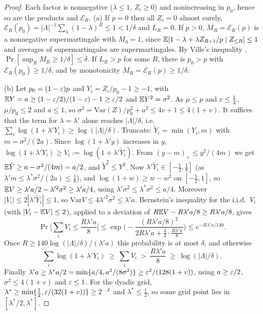 \begin{proof}
Each factor is nonnegative ($\lambda\le1$, $Z_i\ge0$) and nonincreasing in $p_0$, hence so
are the products and $\mathcal E_R$. (a) If $p=0$ then all $Z_i=0$ almost surely,
$\mathcal E_R(p_0)=|\Lambda|^{-1}\sum_\lambda(1-\lambda)^R\le1<1/\delta$ and $L_R=0$. If $p>0$,
$M_R=\mathcal E_R(p)$ is a nonnegative supermartingale with $M_0=1$, since
$\mathbb{E}[1-\lambda+\lambda Z_{R+1}/p\mid Z_{\le R}]\le1$ and averages of supermartingales are
supermartingales. By Ville's inequality \cite{ville1939},
$\Pr[\sup_RM_R\ge1/\delta]\le\delta$. If $L_R>p$ for some $R$, there is $p_0>p$ with
$\mathcal E_R(p_0)\ge1/\delta$, and by monotonicity $M_R=\mathcal E_R(p)\ge1/\delta$.

(b) Let $p_0=(1-\varepsilon)p$ and $Y_i=Z_i/p_0-1\ge-1$, with $\mathbb{E} Y=a\ge(1-\varepsilon/2)/(1-\varepsilon)-1\ge
\varepsilon/2$ and $\mathbb{E} Y^2=\sigma^2$. As $\mu\le p$ and $\varepsilon\le\frac12$, $\mu/p_0\le2$ and
$a\le1$, so $\sigma^2=\mathrm{Var}(Z)/p_0^2+a^2\le4v+1\le4(1+v)$. It suffices that the
term for $\lambda=\lambda'$ alone reaches $|\Lambda|/\delta$, i.e.\
$\sum_i\log(1+\lambda'Y_i)\ge\log(|\Lambda|/\delta)$. Truncate: $\tilde Y_i=\min(Y_i,m)$ with
$m=\sigma^2/(2a)$. Since $\log(1+\lambda'y)$ increases in $y$, $\log(1+\lambda'Y_i)\ge
V_i:=\log(1+\lambda'\tilde Y_i)$. From $(y-m)_+\le y^2/(4m)$ we get $\mathbb{E}\tilde Y\ge
a-\sigma^2/(4m)=a/2$, and $\tilde Y^2\le Y^2$. Now $\lambda'\tilde Y_i\in[-\frac12,\frac18]$
(as $\lambda'm\le\lambda^*\sigma^2/(2a)\le\frac18$), and $\log(1+w)\ge w-w^2$ on $[-\frac12,1]$, so
$\mathbb{E} V\ge\lambda'a/2-\lambda'^2\sigma^2\ge\lambda'a/4$, using $\lambda'\sigma^2\le\lambda^*\sigma^2\le a/4$.
Moreover $|V_i|\le2|\lambda'\tilde Y_i|\le1$, so $\mathrm{Var}V\le4\lambda'^2\sigma^2\le\lambda'a$.
Bernstein's inequality for the i.i.d.\ $V_i$ (with $|V_i-\mathbb{E} V|\le2$), applied to a
deviation of $R\mathbb{E} V-R\lambda'a/8\ge R\lambda'a/8$, gives
\[
\Pr\Big[\sum_iV_i\le\frac{R\lambda'a}8\Big]\le\exp\Big(-\frac{(R\lambda'a/8)^2}{2R\lambda'a+\frac43\cdot
\frac{R\lambda'a}8}\Big)\le e^{-R\lambda'a/140}.
\]
Once $R\ge140\log(|\Lambda|/\delta)/(\lambda'a)$ this probability is at most $\delta$,
and otherwise
\[
\sum_i\log(1+\lambda'Y_i)\ \ge\ \sum_iV_i\ >\ \frac{R\lambda'a}8\ \ge\ \log(|\Lambda|/\delta).
\]
Finally $\lambda'a\ge\lambda^*a/2=\min\{a/4,a^2/(8\sigma^2)\}\ge\varepsilon^2/(128(1+v))$, using
$a\ge\varepsilon/2$, $\sigma^2\le4(1+v)$ and $\varepsilon\le1$. For the dyadic grid,
$\lambda^*\ge\min\{\frac12,\varepsilon/(32(1+v))\}\ge2^{-J}$ and $\lambda^*\le\frac12$, so some
grid point lies in $[\lambda^*/2,\lambda^*]$.
\end{proof}

